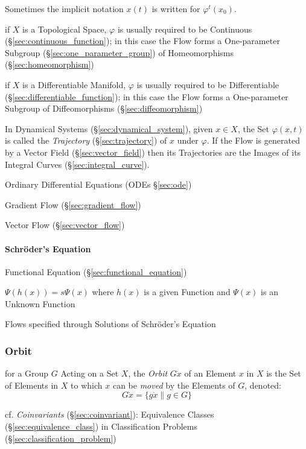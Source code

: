 Sometimes the implicit notation $x(t)$ is written for $\varphi^t(x_0)$.

if $X$ is a Topological Space, $\varphi$ is usually required to be Continuous
(\S\ref{sec:continuous_function}); in this case the Flow forms a One-parameter
Subgroup (\S\ref{sec:one_parameter_group}) of Homeomorphisms
(\S\ref{sec:homeomorphism})

if $X$ is a Differentiable Manifold, $\varphi$ is usually required to be
Differentiable (\S\ref{sec:differentiable_function}); in this case the Flow
forms a One-parameter Subgroup of Diffeomorphisms (\S\ref{sec:diffeomorphism})

In Dynamical Systems (\S\ref{sec:dynamical_system}), given $x \in X$, the Set
$\varphi(x,t)$ is called the \emph{Trajectory} (\S\ref{sec:trajectory}) of $x$
under $\varphi$. If the Flow is generated by a Vector Field
(\S\ref{sec:vector_field}) then its Trajectories are the Images of its Integral
Curves (\S\ref{sec:integral_curve}).

\fist Ordinary Differential Equations (ODEs \S\ref{sec:ode})

\fist Gradient Flow (\S\ref{sec:gradient_flow})

\fist Vector Flow (\S\ref{sec:vector_flow})



\paragraph{Schr\"oder's Equation}\label{sec:schroders_equation}\hfill

Functional Equation (\S\ref{sec:functional_equation})

$\Psi(h(x)) = s\Psi(x)$ where $h(x)$ is a given Function and $\Psi(x)$ is
an Unknown Function

Flows specified through Solutions of Schr\"oder's Equation




\subsubsection{Orbit}\label{sec:orbit}

for a Group $G$ Acting on a Set $X$, the \emph{Orbit} $G \dot x$ of an Element
$x$ in $X$ is the Set of Elements in $X$ to which $x$ can be \emph{moved} by
the Elements of $G$, denoted:
\[
  G \dot x = \{ g \dot x \| g \in G \}
\]

cf. \emph{Coinvariants} (\S\ref{sec:coinvariant}): Equivalence Classes
(\S\ref{sec:equivalence_class}) in Classification Problems
(\S\ref{sec:classification_problem})

